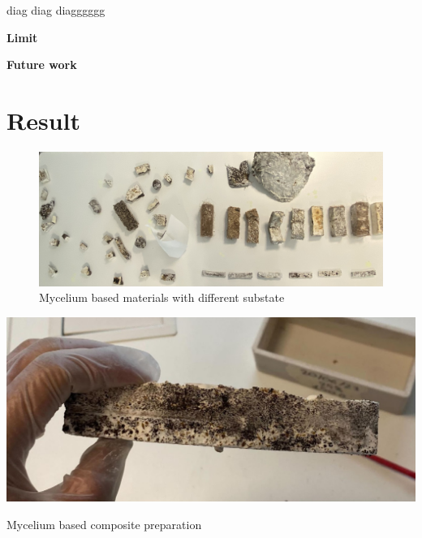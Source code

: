 diag diag diagggggg

\textbf{Limit}

\textbf{Future work}


































\section{Result}

\begin{figure}[h]
    \centering
    \includegraphics{images/resultMyce.png}
    \caption{Mycelium based materials with different substate}
    \label{fig:mycoproduction}
\end{figure} 

\begin{marginfigure}
    \centering
    \includegraphics{images/mycoillustration.png}
    \caption{Mycelium based composite preparation}
    \label{fig:illustration myco}
\end{marginfigure}


